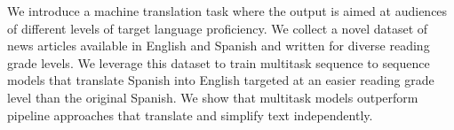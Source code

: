We introduce a machine translation task where the output is aimed at audiences of different levels of target language proficiency. We collect a novel dataset of news articles available in English and Spanish and written for diverse reading grade levels. We leverage this dataset to train multitask sequence to sequence models that translate Spanish into English targeted at an easier reading grade level than the original Spanish. We show that multitask models outperform pipeline approaches that translate and simplify text independently.
